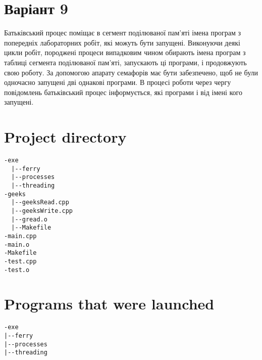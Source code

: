 \documentclass{article}
\begin{document}
 

\newpage 

\large
\section{Варіант 9}
Батьківський процес поміщає в сегмент поділюваної пам'яті імена
програм з попередніх лабораторних робіт, які можуть бути запущені.
Виконуючи деякі цикли робіт, породжені процеси випадковим чином
обирають імена програм з таблиці сегмента поділюваної пам'яті, запускають
ці програми, і продовжують свою роботу. За допомогою апарату семафорів
має бути забезпечено, щоб не були одночасно запущені дві однакові
програми. В процесі роботи через чергу повідомлень батьківський процес
інформується, які програми і від імені кого запущені.

\section{Project directory}
\begin{verbatim}
-exe
  |--ferry
  |--processes
  |--threading
-geeks
  |--geeksRead.cpp
  |--geeksWrite.cpp
  |--gread.o
  |--Makefile
-main.cpp
-main.o
-Makefile
-test.cpp
-test.o

\end{verbatim}

\section{Programs that were launched}
\begin{verbatim}
-exe
|--ferry
|--processes
|--threading
\end{verbatim}
\newpage
\end{document}

